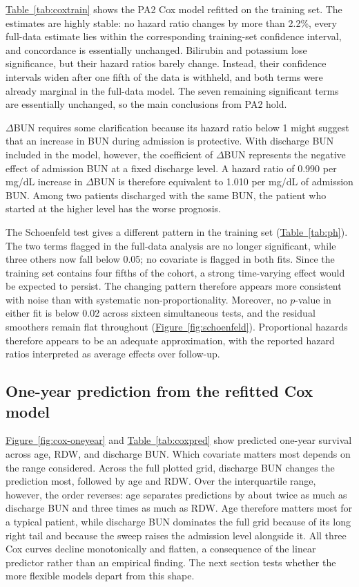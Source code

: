 \documentclass[11pt,a4paper]{article}
\newcommand{\tabref}[1]{\hyperref[#1]{Table~\ref*{#1}}}
\newcommand{\figref}[1]{\hyperref[#1]{Figure~\ref*{#1}}}
\newcommand{\dbun}{$\Delta$BUN}
\begin{document}
\tabref{tab:coxtrain} shows the PA2 Cox model refitted on the training set. The estimates are highly stable: no hazard ratio changes by more than 2.2\%, every full-data estimate lies within the corresponding training-set confidence interval, and concordance is essentially unchanged. Bilirubin and potassium lose significance, but their hazard ratios barely change. Instead, their confidence intervals widen after one fifth of the data is withheld, and both terms were already marginal in the full-data model. The seven remaining significant terms are essentially unchanged, so the main conclusions from PA2 hold.

\dbun{} requires some clarification because its hazard ratio below 1 might suggest that an increase in BUN during admission is protective. With discharge BUN included in the model, however, the coefficient of \dbun{} represents the negative effect of admission BUN at a fixed discharge level. A hazard ratio of 0.990 per mg/dL increase in \dbun{} is therefore equivalent to 1.010 per mg/dL of admission BUN. Among two patients discharged with the same BUN, the patient who started at the higher level has the worse prognosis.

The Schoenfeld test gives a different pattern in the training set (\tabref{tab:ph}). The two terms flagged in the full-data analysis are no longer significant, while three others now fall below 0.05; no covariate is flagged in both fits. Since the training set contains four fifths of the cohort, a strong time-varying effect would be expected to persist. The changing pattern therefore appears more consistent with noise than with systematic non-proportionality. Moreover, no $p$-value in either fit is below 0.02 across sixteen simultaneous tests, and the residual smoothers remain flat throughout (\figref{fig:schoenfeld}). Proportional hazards therefore appears to be an adequate approximation, with the reported hazard ratios interpreted as average effects over follow-up.


\subsection{One-year prediction from the refitted Cox model}

\figref{fig:cox-oneyear} and \tabref{tab:coxpred} show predicted one-year survival across age, RDW, and discharge BUN. Which covariate matters most depends on the range considered. Across the full plotted grid, discharge BUN changes the prediction most, followed by age and RDW. Over the interquartile range, however, the order reverses: age separates predictions by about twice as much as discharge BUN and three times as much as RDW. Age therefore matters most for a typical patient, while discharge BUN dominates the full grid because of its long right tail and because the sweep raises the admission level alongside it. All three Cox curves decline monotonically and flatten, a consequence of the linear predictor rather than an empirical finding. The next section tests whether the more flexible models depart from this shape.
\end{document}

